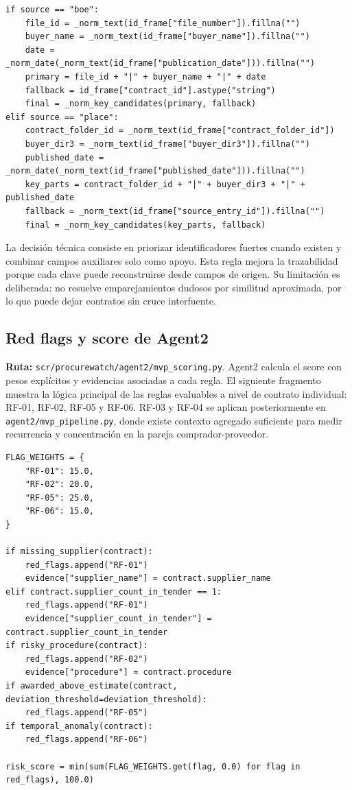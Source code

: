 \documentclass[11pt,a4paper,spanish]{book}
\numberwithin{equation}{chapter}
\numberwithin{figure}{chapter}
\begin{document}
\begin{lstlisting}
if source == "boe":
    file_id = _norm_text(id_frame["file_number"]).fillna("")
    buyer_name = _norm_text(id_frame["buyer_name"]).fillna("")
    date = _norm_date(_norm_text(id_frame["publication_date"])).fillna("")
    primary = file_id + "|" + buyer_name + "|" + date
    fallback = id_frame["contract_id"].astype("string")
    final = _norm_key_candidates(primary, fallback)
elif source == "place":
    contract_folder_id = _norm_text(id_frame["contract_folder_id"])
    buyer_dir3 = _norm_text(id_frame["buyer_dir3"]).fillna("")
    published_date = _norm_date(_norm_text(id_frame["published_date"])).fillna("")
    key_parts = contract_folder_id + "|" + buyer_dir3 + "|" + published_date
    fallback = _norm_text(id_frame["source_entry_id"]).fillna("")
    final = _norm_key_candidates(key_parts, fallback)
\end{lstlisting}

La decisi{\'o}n t{\'e}cnica consiste en priorizar identificadores fuertes cuando existen y combinar
campos auxiliares solo como apoyo. Esta regla mejora la trazabilidad porque cada clave puede
reconstruirse desde campos de origen. Su limitaci{\'o}n es deliberada: no resuelve emparejamientos
dudosos por similitud aproximada, por lo que puede dejar contratos sin cruce interfuente.

\subsection{Red flags y score de Agent2}

\textbf{Ruta:} \texttt{scr/procurewatch/agent2/mvp\_scoring.py}. Agent2 calcula el score con pesos
expl{\'i}citos y evidencias asociadas a cada regla. El siguiente fragmento muestra la l{\'o}gica
principal de las reglas evaluables a nivel de contrato individual: RF-01, RF-02, RF-05 y RF-06.
RF-03 y RF-04 se aplican posteriormente en \texttt{agent2/mvp\_pipeline.py}, donde existe contexto
agregado suficiente para medir recurrencia y concentraci{\'o}n en la pareja comprador-proveedor.

\begin{lstlisting}
FLAG_WEIGHTS = {
    "RF-01": 15.0,
    "RF-02": 20.0,
    "RF-05": 25.0,
    "RF-06": 15.0,
}

if missing_supplier(contract):
    red_flags.append("RF-01")
    evidence["supplier_name"] = contract.supplier_name
elif contract.supplier_count_in_tender == 1:
    red_flags.append("RF-01")
    evidence["supplier_count_in_tender"] = contract.supplier_count_in_tender
if risky_procedure(contract):
    red_flags.append("RF-02")
    evidence["procedure"] = contract.procedure
if awarded_above_estimate(contract, deviation_threshold=deviation_threshold):
    red_flags.append("RF-05")
if temporal_anomaly(contract):
    red_flags.append("RF-06")

risk_score = min(sum(FLAG_WEIGHTS.get(flag, 0.0) for flag in red_flags), 100.0)
\end{lstlisting}
\end{document}
